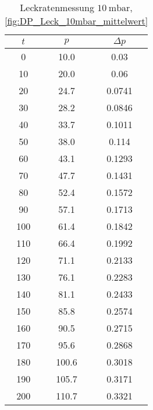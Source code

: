 \begin{table}[H]
    \centering
    \caption{Leckratenmessung $\SI{10}{\milli\bar}$, \ref{fig:DP_Leck_10mbar_mittelwert}}
    \label{tab:}
    \begin{tabular}{c c c}
        \toprule
        {$t$} & {$p$} & {$\Delta p$} \\
        \midrule
        0 & 10.0 & 0.03 \\
        10 & 20.0 & 0.06\\
        20 & 24.7 & 0.0741\\
        30 & 28.2 & 0.0846\\
        40 & 33.7 & 0.1011\\
        50 & 38.0 & 0.114\\
        60 & 43.1 & 0.1293\\
        70 & 47.7 & 0.1431\\
        80 & 52.4 & 0.1572\\
        90 & 57.1 & 0.1713\\
        100 & 61.4 & 0.1842\\
        110 & 66.4 & 0.1992\\
        120 & 71.1 & 0.2133\\
        130 & 76.1 & 0.2283\\
        140 & 81.1 & 0.2433\\
        150 & 85.8 & 0.2574\\
        160 & 90.5 & 0.2715\\
        170 & 95.6 & 0.2868\\
        180 & 100.6 & 0.3018\\
        190 & 105.7 & 0.3171\\
        200 & 110.7 & 0.3321\\
        \bottomrule
    \end{tabular}
\end{table}

